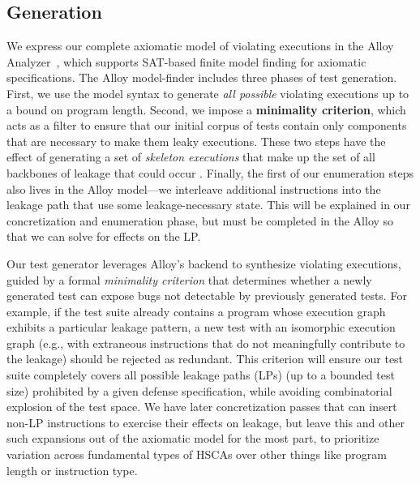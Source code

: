 \subsection{Generation}
We express our complete axiomatic model of violating executions in the Alloy Analyzer~\cite{jackson2002alloy}, which supports SAT-based finite model finding for axiomatic specifications. The Alloy model-finder includes three phases of test generation. First, we use the model syntax to generate \textit{all possible} violating executions up to a bound on program length. Second, we impose a \textbf{minimality criterion}, which acts as a filter to ensure that our initial corpus of tests contain only components that are necessary to make them leaky executions. These two steps have the effect of generating a set of \textit{skeleton executions} that make up the set of all backbones of leakage that could occur . Finally, the first of our enumeration steps also lives in the Alloy model—we interleave additional instructions into the leakage path that use some leakage-necessary state. This will be explained in our concretization and enumeration phase, but must be completed in the Alloy so that we can solve for effects on the LP. 

Our test generator leverages Alloy's backend to synthesize violating executions, guided by a formal \textit{minimality criterion} that determines whether a newly generated test can expose bugs not detectable by previously generated tests. For example, if the test suite already contains a program whose execution graph exhibits a particular leakage pattern, a new test with an isomorphic execution graph (e.g., with extraneous instructions that do not meaningfully contribute to the leakage) should be rejected as redundant. This criterion will ensure our test suite completely covers all possible leakage paths (LPs) (up to a bounded test size) prohibited by a given defense specification, while avoiding combinatorial explosion of the test space. 
We have later concretization passes that can insert non-LP instructions to exercise their effects on leakage, but leave this and other such expansions out of the axiomatic model for the most part, to prioritize variation across fundamental types of HSCAs over other things like program length or instruction type.

